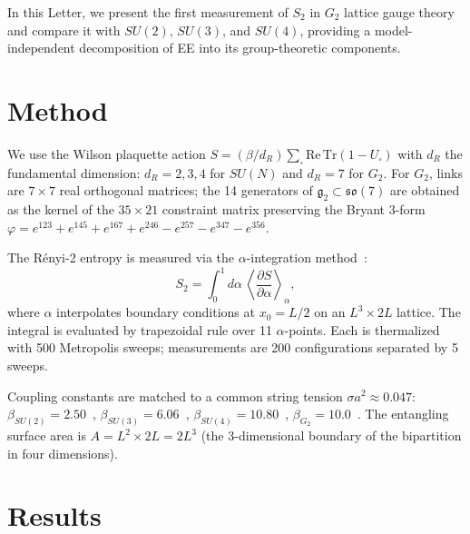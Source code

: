 \documentclass[twocolumn,prl,nofootinbib,superscriptaddress]{revtex4-2}
\begin{document}
In this Letter, we present the first measurement of $S_2$ in $G_2$ lattice gauge theory and compare it with $SU(2)$, $SU(3)$, and $SU(4)$, providing a model-independent decomposition of EE into its group-theoretic components.

\section{Method}

We use the Wilson plaquette action $S = (\beta/d_R)\sum_\square \mathrm{Re}\,\mathrm{Tr}(1 - U_\square)$ with $d_R$ the fundamental dimension: $d_R = 2,3,4$ for $SU(N)$ and $d_R = 7$ for $G_2$.  For $G_2$, links are $7\times 7$ real orthogonal matrices; the 14 generators of $\mathfrak{g}_2 \subset \mathfrak{so}(7)$ are obtained as the kernel of the $35\times 21$ constraint matrix preserving the Bryant 3-form $\varphi = e^{123} + e^{145} + e^{167} + e^{246} - e^{257} - e^{347} - e^{356}$.

The R\'enyi-2 entropy is measured via the $\alpha$-integration method~\cite{Buividovich2008}:
\begin{equation}\label{eq:alpha}
S_2 = \int_0^1 d\alpha\, \left\langle \frac{\partial S}{\partial \alpha} \right\rangle_\alpha,
\end{equation}
where $\alpha$ interpolates boundary conditions at $x_0 = L/2$ on an $L^3 \times 2L$ lattice.  The integral is evaluated by trapezoidal rule over 11 $\alpha$-points.  Each is thermalized with 500 Metropolis sweeps; measurements are 200 configurations separated by 5 sweeps.

Coupling constants are matched to a common string tension $\sigma a^2 \approx 0.047$:
$\beta_{SU(2)} = 2.50$~\cite{Fingberg1993},
$\beta_{SU(3)} = 6.06$~\cite{NeccoSommer2002},
$\beta_{SU(4)} = 10.80$~\cite{Lucini2001},
$\beta_{G_2} = 10.0$~\cite{Bruno2015}.
The entangling surface area is $A = L^2 \times 2L = 2L^3$ (the 3-dimensional boundary of the bipartition in four dimensions).

\section{Results}
\end{document}
